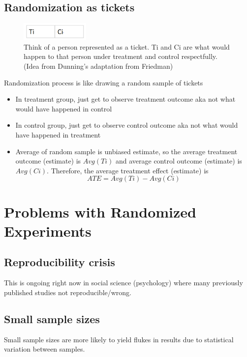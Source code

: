 \subsection{Randomization as tickets}
\begin{figure}[ht]
 \begin{center}
   \includegraphics[width=0.3\textwidth]{Figures/Figure_1.PNG}
    \caption{
    Think of a person represented as a ticket. Ti and Ci are what would happen to that person under treatment and control respectfully. (Idea from Dunning's adaptation from Friedman)}
    \label{fig:Figure_1}
  \end{center}
\end{figure}
Randomization process is like drawing a random sample of tickets
\begin{itemize}
\item In treatment group, just get to observe treatment outcome aka not what would have happened in control
\item In control group, just get to observe control outcome aka not what would have happened in treatment
\item Average of random sample is unbiased estimate, so the average treatment outcome (estimate) is \(Avg(Ti)\) and average control outcome (estimate) is \(Avg(Ci)\). Therefore, the average treatment effect (estimate) is
\[ATE = Avg(Ti) - Avg(Ci)\]
\end{itemize}

\section{Problems with Randomized Experiments}
\subsection{Reproducibility crisis}
This is ongoing right now in social science (psychology) where many previously published studies not reproducible/wrong. 
\subsection{Small sample sizes}
Small sample sizes are more likely to yield flukes in results due to statistical variation between samples.\newline

